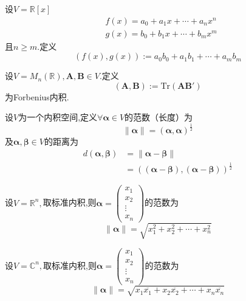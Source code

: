 \begin{brown}
    \begin{example}
        设$V=\mathbb{R}\left[x\right]$\begin{align*}
            &f\left(x\right)=a_0+a_1x+\cdots+a_nx^n\\
            &g\left(x\right)=b_0+b_1x+\cdots+b_mx^m
        \end{align*}且$n\geqslant m.$定义\[
        \left(
            f\left(x\right),g\left(x\right)
        \right):=a_0b_0+a_1b_1+\cdots+a_mb_m
        \]
    \end{example}
\end{brown}
\begin{brown}
    \begin{example}
        设$V=M_n\left(\mathbb{R}\right),\bm{A},\bm{B}\in V$.定义\[
        \left(
            \bm{A},\bm{B}
        \right):=\mathrm{Tr}\left(
            \bm{A}\bm{B}'
        \right)
        \]为\textup{Forbenius}内积.
    \end{example}
\end{brown}
\begin{formal}
    \begin{definition}[范数的定义]\label{def:范数的定义}
        设$V$为一个内积空间,定义$\forall \bm{\alpha}\in V$的范数（长度）为\[
        \left\lVert \bm{\alpha}\right\rVert =\left(\bm{\alpha},\bm{\alpha}\right)^{\frac{1}{2}}
        \]及$\bm{\alpha},\bm{\beta}\in V$的距离为\begin{align*}
        d\left(
            \bm{\alpha},\bm{\beta}
        \right)&=\left\lVert \bm{\alpha}-\bm{\beta}\right\rVert \\
        &=\left(
            \left(
                \bm{\alpha}-\bm{\beta}
            \right),\left(
                \bm{\alpha}-\bm{\beta}
            \right)
        \right)^{\frac{1}{2}}
        \end{align*}
    \end{definition}
\end{formal}
\begin{brown}
    \begin{example}
        设$V=\mathbb{R}^n,$取标准内积,则$\bm{\alpha}=\begin{pmatrix}
            x_1\\x_2\\\vdots\\x_n
        \end{pmatrix}$的范数为\[
        \left\lVert \bm{\alpha}\right\rVert =\sqrt{
            x_1^2+x_2^2+\cdots+x_n^2   
        }
        \]

        设$V=\mathbb{C}^n,$取标准内积,则$\bm{\alpha}=\begin{pmatrix}
            x_1\\x_2\\\vdots\\x_n
        \end{pmatrix}$的范数为\[
        \left\lVert \bm{\alpha}\right\rVert =\sqrt{
            x_1\overline{x_1}+x_2\overline{x_2}+\cdots+x_n\overline{x_n}   
        }
        \]
    \end{example}
\end{brown}
